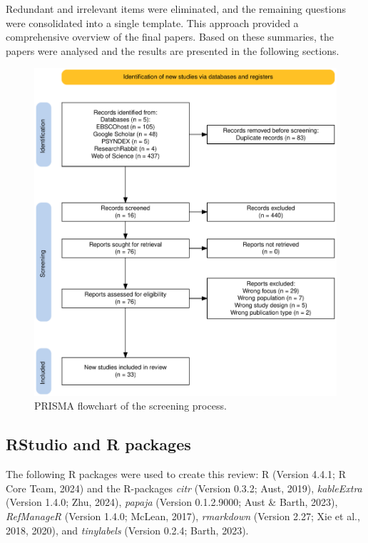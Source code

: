 \documentclass[
  stu]{apa7}
\begin{document}
Redundant and irrelevant items were eliminated, and the remaining questions were consolidated into a single template.
This approach provided a comprehensive overview of the final papers.
Based on these summaries, the papers were analysed and the results are presented in the following sections.

\begin{figure}
\centering
\includegraphics{files/prisma.pdf}
\caption{\label{fig:prisma}PRISMA flowchart of the screening process.}
\end{figure}

\subsection{RStudio and R packages}\label{rstudio-and-r-packages}

The following R packages were used to create this review: R (Version 4.4.1; R Core Team, 2024) and the R-packages \emph{citr} (Version 0.3.2; Aust, 2019), \emph{kableExtra} (Version 1.4.0; Zhu, 2024), \emph{papaja} (Version 0.1.2.9000; Aust \& Barth, 2023), \emph{RefManageR} (Version 1.4.0; McLean, 2017), \emph{rmarkdown} (Version 2.27; Xie et al., 2018, 2020), and \emph{tinylabels} (Version 0.2.4; Barth, 2023).
\end{document}

